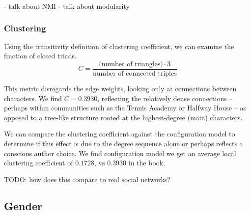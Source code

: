 - talk about NMI
- talk about modularity

\subsubsection{Clustering}
Using the transitivity definition of clustering coefficient, we can examine the fraction of closed triads.
$$ C = \frac{\text{(number of triangles)} \cdot 3}{\text{number of connected triples}} $$

This metric disregards the edge weights, looking only at connections between characters. We find $C = 0.3930$, reflecting the relatively dense connections -- perhaps within communities such as the Tennis Academy or Halfway House -- as opposed to a tree-like structure rooted at the highest-degree (main) characters.

We can compare the clustering coefficient against the configuration model to determine if this effect is due to the degree sequence alone or perhaps reflects a conscious author choice. We find configuration model we get an average local clustering coefficient of 0$.1728$, vs $0.3930$ in the book. 

TODO: how does this compare to real social networks?

\subsection{Gender}

